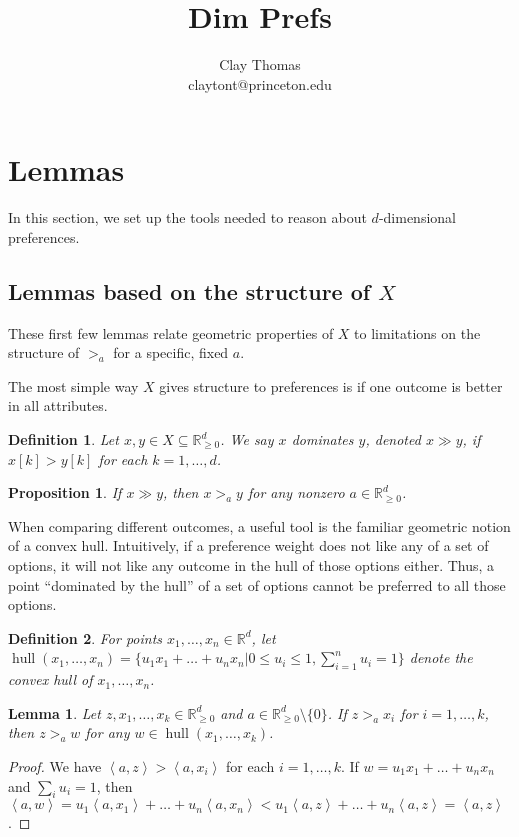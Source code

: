 \documentclass[12pt]{article}
\newtheorem*{definition}{Definition}
\newtheorem{proposition}[theorem]{Proposition}
\newtheorem{lemma}[theorem]{Lemma}
\newcommand{\R}{\mathbb{R}}
\newcommand{\Rgz}{\mathbb{R}_{\ge 0}}
\newcommand{\ip}[2]{\left\langle{#1},{#2}\right\rangle}
\DeclareMathOperator*{\hull}{hull}
\newcommand{\1}[1]{\mathds{1}[{#1}]}
\begin{document}
 
\title{
  Dim Prefs
}
\author{
  Clay Thomas \\
  claytont@princeton.edu
}
\maketitle

\section{Lemmas}
  In this section, we set up the tools needed to reason about 
  $d$-dimensional preferences.

  \subsection{Lemmas based on the structure of $X$}
    These first few lemmas relate geometric properties of $X$ to
    limitations on the structure of $>_a$ for a specific, fixed $a$.

    The most simple way $X$ gives structure to preferences is if
    one outcome is better in all attributes.
    \begin{definition}
      Let $x,y\in X\subseteq \Rgz^d$.
      We say $x$ \emph{dominates} $y$, denoted $x\gg y$,
      if $x[k] > y[k]$ for each $k=1,\ldots,d$.
    \end{definition}
    \begin{proposition}
      If $x \gg y$, then $x >_a y$ for any nonzero $a\in \Rgz^d$.
    \end{proposition}

    When comparing different outcomes, a useful tool is
    the familiar geometric notion of a convex hull.
    Intuitively, if a preference weight does not like any of a set of options,
    it will not like any outcome in the hull of those options either.
    Thus, a point ``dominated by the hull'' of a set of options
    cannot be preferred to all those options.
    \begin{definition}
      For points $x_1,\ldots,x_n \in \R^d$, let $\hull(x_1,\ldots,x_n)
      = \{u_1x_1 + \ldots + u_nx_n | 0\le u_i\le 1, \sum_{i=1}^n u_i = 1\}$
      denote the convex hull of $x_1,\ldots,x_n$.
    \end{definition}
    \begin{lemma}\label{lem:agreementHull}
      Let $z,x_1,\ldots,x_k \in \Rgz^d$ and $a\in \Rgz^d \setminus \{0\}$.
      If $z >_a x_i$ for $i=1,\ldots,k$, then $z >_a w$
      for any $w\in \hull(x_1,\ldots,x_k)$.
    \end{lemma}
    \begin{proof}
      We have $\ip{a}{z} > \ip{a}{x_i}$ for each $i=1,\ldots,k$.
      If $w = u_1x_1+ \ldots + u_nx_n$ and $\sum_i u_i =1$, then
      $\ip{a}{w} = u_1\ip{a}{x_1}+\ldots+u_n\ip{a}{x_n}
      < u_1\ip{a}{z} + \ldots + u_n\ip{a}{z} = \ip{a}{z}$.
    \end{proof}
\end{document}
